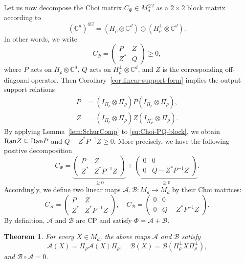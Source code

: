 \documentclass[11pt,reqno]{amsart}
\newtheorem{theorem}{Theorem}[section]
\theoremstyle{definition}
\theoremstyle{definition}
\theoremstyle{definition}
\theoremstyle{definition}
\newcommand{\A}{\mathcal{A}}
\newcommand{\B}{\mathcal{B}}
\newcommand{\Comp}{\mathbb{C}}
\begin{document}
Let us now decompose the Choi matrix $C_{\Phi}\in M_d^{\otimes 2}$ as a $2\times 2$ block matrix according to 
    $$(\Comp^d)^{\otimes 2}=(H_{\rho}\otimes \Comp^d)\oplus (H_{\rho}^{\perp}\otimes \Comp^d).$$
In other words, we write
\begin{equation}\label{eq:Choi-PQ-block}
 C_{\Phi}=
 \begin{pmatrix}
 P&Z\\Z^*&Q
 \end{pmatrix}\geq 0,
\end{equation}
where $P$ acts on $H_{\rho}\otimes \Comp^d$, $Q$ acts on
$H_{\rho}^{\perp}\otimes \Comp^d$, and $Z$ is the corresponding off-diagonal
operator. Then Corollary~\ref{cor:linear-support-form} implies the output support relations
\begin{equation} \label{eq:AB-output-support}
\begin{split}
    P &=(I_{H_{\rho}}\otimes \Pi_{\rho})P(I_{H_{\rho}}\otimes \Pi_{\rho}),\\
    Z &=(I_{H_{\rho}}\otimes \Pi_{\rho})Z(I_{H_{\rho}^{\perp}}\otimes \Pi_{\rho}).
\end{split}
\end{equation}
By applying Lemma~\ref{lem:SchurComp} to
\eqref{eq:Choi-PQ-block}, we obtain ${\rm Ran} Z\subseteq{\rm Ran} P$ and $Q-Z^*P^{-1}Z\geq 0.$ More precisely, we have the following positive decomposition
    $$C_{\Phi}= \underbrace{\begin{pmatrix} P&Z\\Z^*&Z^*P^{-1}Z
    \end{pmatrix}}_{\geq 0} + \underbrace{\begin{pmatrix} 0&0\\0&Q-Z^*P^{-1}Z
    \end{pmatrix}}_{\geq 0}.$$
Accordingly, we define two linear maps $\A,\B:M_d\to M_d$ by their Choi
matrices:
    $$C_{\A} = \begin{pmatrix} P&Z\\Z^*&Z^*P^{-1}Z
    \end{pmatrix}, \quad 
     C_{\B} =
    \begin{pmatrix} 0&0\\0&Q-Z^*P^{-1}Z
    \end{pmatrix}.$$
By definition, $\A$ and $\B$ are CP and satisfy $\Phi = \A + \B$. 

\begin{theorem}
\label{thm:Perron-splitting-full}
For every $X\in M_d$, the above maps $\A$ and $\B$ satisfy
    $$\mathcal{A}(X) =\Pi_{\rho}\A(X)\Pi_{\rho}, \quad  \mathcal{B}(X)=\B(\Pi_{\rho}^{\perp}X\Pi_{\rho}^{\perp}),$$
and $\B \circ \A = 0$.
\end{theorem}
\end{document}
